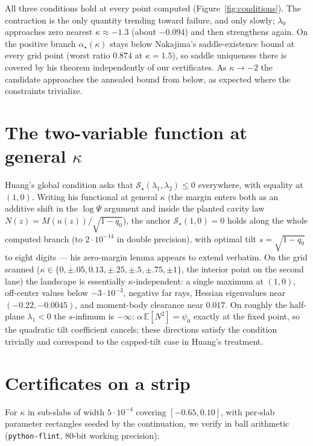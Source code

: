 \documentclass[11pt]{article}
\theoremstyle{remark}
\newcommand{\E}{\mathbb{E}}
\begin{document}
All three conditions hold at every point computed
(Figure~\ref{fig:conditions}).  The contraction is the only quantity
trending toward failure, and only slowly; $\lambda_0$ approaches zero
nearest $\kappa\approx-1.3$ (about $-0.094$) and then strengthens
again.  On the positive branch $\alpha_\star(\kappa)$ stays below
Nakajima's saddle-existence bound at every grid point (worst ratio
$0.874$ at $\kappa=1.5$), so saddle uniqueness there is covered by his
theorem independently of our certificates.  As $\kappa\to-2$ the
candidate approaches the annealed bound from below, as expected where
the constraints trivialize.

\section{The two-variable function at general $\kappa$}

Huang's global condition asks that
$\mathcal S_\star(\lambda_1,\lambda_2)\le0$ everywhere, with equality
at $(1,0)$.  Writing his functional at general $\kappa$ (the margin
enters both as an additive shift in the $\log\Psi$ argument and inside
the planted cavity law $N(z)=M(u(z))/\sqrt{1-q_0}$), the anchor
$\mathcal S_\star(1,0)=0$ holds along the whole computed branch (to
$2\cdot10^{-14}$ in double precision), with optimal tilt
$s=\sqrt{1-q_0}$ to eight digits --- his zero-margin lemma appears to
extend verbatim.  On the grid scanned
($\kappa\in\{0,\pm.05,0.13,\pm.25,\pm.5,\pm.75,\pm1\}$, the interior
point on the second lane) the landscape is
essentially $\kappa$-independent: a single maximum at $(1,0)$,
off-center values below $-3\cdot10^{-3}$, negative far rays, Hessian
eigenvalues near $(-0.22,-0.0045)$, and moment-body clearance near
$0.017$.  On roughly the half-plane $\lambda_1<0$ the $s$-infimum is
$-\infty$: $\alpha\,\E[N^2]=\psi_0$ exactly at the fixed point, so the
quadratic tilt coefficient cancels; these directions satisfy the
condition trivially and correspond to the capped-tilt case in Huang's
treatment.

\section{Certificates on a strip}

For $\kappa$ in sub-slabs of width $5\cdot10^{-4}$ covering
$[-0.65,0.10]$, with per-slab parameter rectangles seeded by the
continuation, we verify in ball arithmetic
(\texttt{python-flint}, 80-bit working precision):
\end{document}
